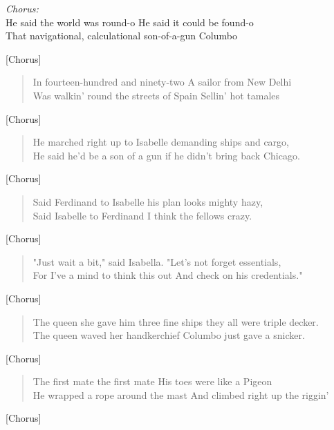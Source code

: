 
\begin{center}
\textit{Chorus:} \\
He said the world was round-o He said it could be found-o \\
That navigational, calculational son-of-a-gun Columbo
\end{center}

[Chorus]

\begin{verse}
In fourteen-hundred and ninety-two A sailor from New Delhi \\
Was walkin' round the streets of Spain Sellin' hot tamales \\
\end{verse}

[Chorus]

\begin{verse}
He marched right up to Isabelle demanding ships and cargo, \\
He said he'd be a son of a gun if he didn't bring back Chicago. \\
\end{verse}

[Chorus]

\begin{verse}
Said Ferdinand to Isabelle his plan looks mighty hazy, \\
Said Isabelle to Ferdinand I think the fellows crazy. \\
\end{verse}

[Chorus]

\begin{verse}
"Just wait a bit," said Isabella. "Let's not forget essentials, \\
For I've a mind to think this out And check on his credentials." \\
\end{verse}

[Chorus]

\begin{verse}
The queen she gave him three fine ships they all were triple decker. \\
The queen waved her handkerchief Columbo just gave a snicker. \\
\end{verse}

[Chorus]

\begin{verse}
The first mate the first mate His toes were like a Pigeon \\
He wrapped a rope around the mast And climbed right up the riggin' \\
\end{verse}

[Chorus]
